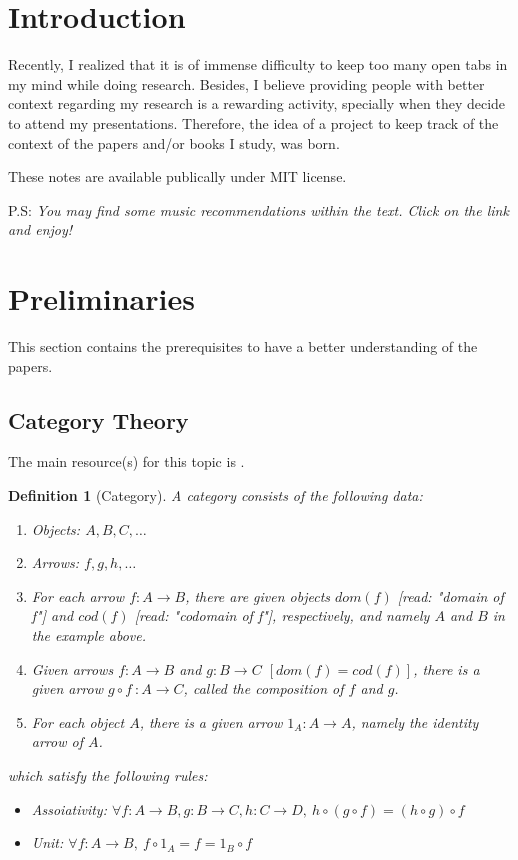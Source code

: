 \documentclass[12pt]{extarticle}
\newtheorem{defn}{Definition}[section]
\begin{document}
\section{Introduction}

Recently, I realized that it is of immense difficulty to keep too many open tabs in my mind while doing research. Besides, I believe providing people with better context regarding my research is a rewarding activity, specially when they decide to attend my presentations. Therefore, the idea of a project to keep track of the context of the papers and/or books I study, was born.

These notes are available publically under MIT license.

P.S: \emph{You may find some music recommendations within the text. Click on the link and enjoy!}    
\section{Preliminaries}
This section contains the prerequisites to have a better understanding of the papers.
\subsection{Category Theory}
The main resource(s) for this topic is \cite{Awodey2010-AWOCTA}.
\begin{defn}[Category]
    A \emph{category} consists of the following data:
    \begin{enumerate}
        \item \emph{Objects}: \(A, B, C,\dots\)
        \item \emph{Arrows}: \(f, g, h,\dots\)
        \item For each arrow \(f : A \rightarrow B\), there are given objects \(dom(f)\) \emph{[read: "domain of f"]} and \(cod(f)\) \emph{[read: "codomain of f"]}, respectively, and namely \(A\) and \(B\) in the example above.
        \item Given arrows \(f: A \rightarrow B\) and \(g : B \rightarrow C\) \([dom(f) = cod(f)]\), there is a given arrow \(g \circ f\ : A \rightarrow C \), called the \emph{composition of \(f\) and \(g\)}.
        \item For each object \(A\), there is a given arrow \(1_{A} : A \rightarrow A\), namely the identity arrow of \(A\).
    \end{enumerate}
    which satisfy the following rules:
    \begin{itemize}
        \item \emph{Assoiativity}: \( \forall f : A \rightarrow B, g: B \rightarrow C, h: C \rightarrow D, \ h \circ (g \circ f) = (h \circ g) \circ f\)
        \item \emph{Unit}: \( \forall f : A \rightarrow B, \ f \circ 1_A = f = 1_B \circ f\)
    \end{itemize}
\end{defn}
\end{document}
